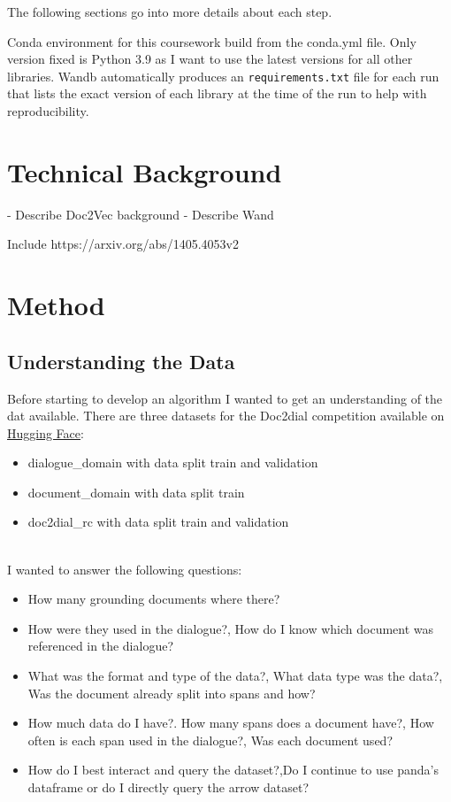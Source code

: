 \documentclass[11pt]{article}
\begin{document}
    The following sections go into more details about each step.

    Conda environment for this coursework build from the conda.yml file. Only version fixed is Python 3.9 as I want
    to use the latest versions for all other libraries. Wandb \cite{wandb} automatically produces an \texttt{requirements.txt}
    file for each run that lists the exact version of each library at the time of the run to help with reproducibility.


    \section{Technical Background}\label{sec:technical-background}

    - Describe Doc2Vec background
    - Describe Wand

    Include https://arxiv.org/abs/1405.4053v2


    \section{Method}\label{sec:method}

    \subsection{Understanding the Data}\label{subsec:understanding-the-data-method}
    Before starting to develop an algorithm I wanted to get an understanding of the dat available.
    There are three datasets for the Doc2dial competition available on \href{https://huggingface.co/datasets/doc2dial}{Hugging Face}:
    \begin{itemize}
        \item dialogue\_domain with data split train and validation
        \item document\_domain with data split train
        \item doc2dial\_rc with data split train and validation
    \end{itemize}\\

    I wanted to answer the following questions:
    \begin{itemize}
        \item How many grounding documents where there?
        \item How were they used in the dialogue?, How do I know which document was referenced in the dialogue?
        \item What was the format and type of the data?, What data type was the data?,
        Was the document already split into spans and how?
        \item How much data do I have?. How many spans does a document have?, How often is each span used in the dialogue?,
        Was each document used?
        \item How do I best interact and query the dataset?,Do I continue to use panda's dataframe or do I directly query
        the arrow dataset?
    \end{itemize}
\end{document}
